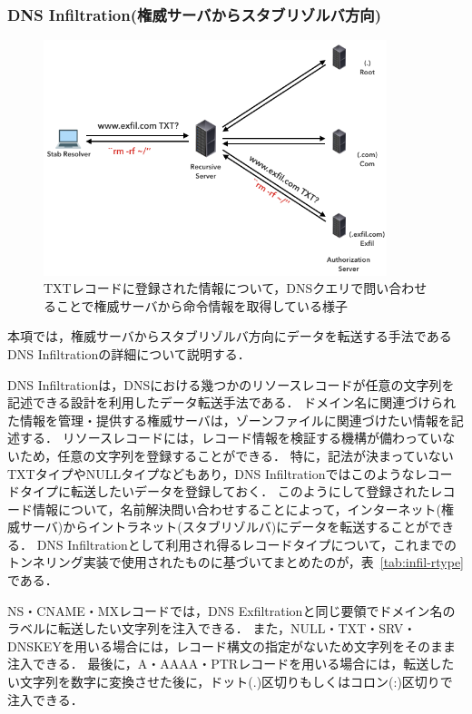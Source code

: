 \subsubsection{DNS Infiltration(権威サーバからスタブリゾルバ方向)}
\label{sec:dns-infiltration}

\begin{figure}[h]
 \centering
 \includegraphics[width=10.0cm]{figure/dns-infiltration.png}
 \caption[DNS Infiltrationの概略図]{TXTレコードに登録された情報について，DNSクエリで問い合わせることで権威サーバから命令情報を取得している様子}
 \label{fig:dns-infiltration}
\end{figure}

本項では，権威サーバからスタブリゾルバ方向にデータを転送する手法であるDNS Infiltrationの詳細について説明する．

DNS Infiltrationは，DNSにおける幾つかのリソースレコードが任意の文字列を記述できる設計を利用したデータ転送手法である．
ドメイン名に関連づけられた情報を管理・提供する権威サーバは，ゾーンファイルに関連づけたい情報を記述する．
リソースレコードには，レコード情報を検証する機構が備わっていないため，任意の文字列を登録することができる．
特に，記法が決まっていないTXTタイプやNULLタイプなどもあり，DNS Infiltrationではこのようなレコードタイプに転送したいデータを登録しておく．
このようにして登録されたレコード情報について，名前解決問い合わせすることによって，インターネット(権威サーバ)からイントラネット(スタブリゾルバ)にデータを転送することができる．
DNS Infiltrationとして利用され得るレコードタイプについて，これまでのトンネリング実装で使用されたものに基づいてまとめたのが，表~\ref{tab:infil-rtype}である．


NS・CNAME・MXレコードでは，DNS Exfiltrationと同じ要領でドメイン名のラベルに転送したい文字列を注入できる．
また，NULL・TXT・SRV・DNSKEYを用いる場合には，レコード構文の指定がないため文字列をそのまま注入できる．
最後に，A・AAAA・PTRレコードを用いる場合には，転送したい文字列を数字に変換させた後に，ドット(.)区切りもしくはコロン(:)区切りで注入できる．

